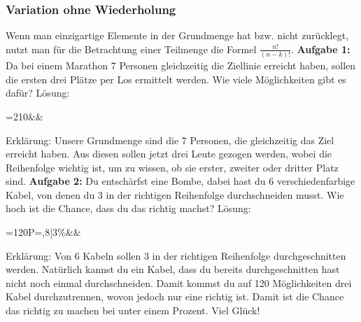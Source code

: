 \documentclass[12pt]{article}
\begin{document}
			\subsubsection{Variation ohne Wiederholung}
				Wenn man einzigartige Elemente in der Grundmenge hat bzw. nicht zurücklegt, nutzt man für die Betrachtung einer Teilmenge die Formel $\frac{n!}{(n-k)!}$.\newline\newline
				\textbf{Aufgabe 1:} Da bei einem Marathon 7 Personen gleichzeitig die Ziellinie erreicht haben, sollen die ersten drei Plätze per Los ermittelt werden. Wie viele Möglichkeiten gibt es dafür?\newline\newline
				Lösung:
				\begin{flalign*}
					=210&&
				\end{flalign*}
				Erklärung: Unsere Grundmenge sind die 7 Personen, die gleichzeitig das Ziel erreicht haben. Aus diesen sollen jetzt drei Leute gezogen werden, wobei die Reihenfolge wichtig ist, um zu wissen, ob sie erster, zweiter oder dritter Platz sind.\newline\newline
				\textbf{Aufgabe 2:} Du entschärfst eine Bombe, dabei hast du 6 verschiedenfarbige Kabel, von denen du 3 in der richtigen Reihenfolge durchschneiden musst. Wie hoch ist die Chance, dass du das richtig machst?\newline\newline
				Lösung:
				\begin{flalign*}
				=120\Rightarrow P=\;\widehat{=},8\bar{3}\%&&
				\end{flalign*}
				Erklärung: Von 6 Kabeln sollen 3 in der richtigen Reihenfolge durchgeschnitten werden. Natürlich kannst du ein Kabel, dass du bereits durchgeschnitten hast nicht noch einmal durchschneiden. Damit kommst du auf 120 Möglichkeiten drei Kabel durchzutrennen, wovon jedoch nur eine richtig ist. Damit ist die Chance das richtig zu machen bei unter einem Prozent. Viel Glück!
\end{document}
